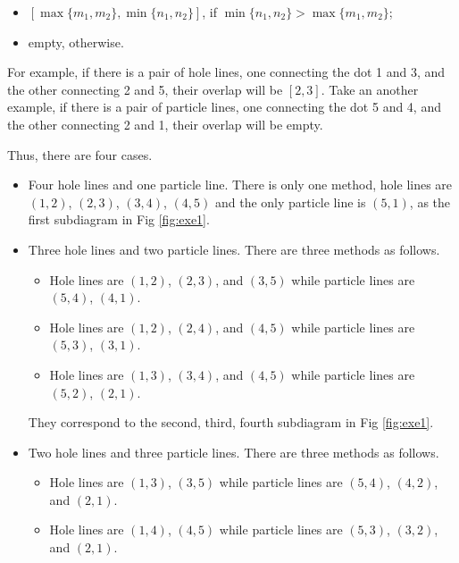 \documentclass[a4paper]{book}
\newcounter{solution}[chapter]
\newcommand\Figref[1]{Fig \ref{#1}}
\begin{document}
\begin{solution}
\begin{itemize}
	\item $[\max\{m_1, m_2\},\min\{n_1, n_2\}]$, if $\min\{n_1, n_2\} > \max\{m_1, m_2\}$;
	
	\item empty, otherwise. 
	
	\end{itemize}
	For example, if there is a pair of hole lines, one connecting the dot 1 and 3, and the other connecting 2 and 5, their overlap will be $[2, 3]$. Take an another example, if there is a pair of particle lines, one connecting the dot 5 and 4, and the other connecting 2 and 1, their overlap will be empty.
	
	Thus, there are four cases.
	\begin{itemize}
	
	\item Four hole lines and one particle line. There is only one method, hole lines are $(1,2)$, $(2,3)$, $(3,4)$, $(4,5)$ and the only particle line is $(5,1)$, as the first subdiagram in \Figref{fig:exe1}.
	
	\item Three hole lines and two particle lines. There are three methods as follows.
		\begin{itemize}
	
		\item Hole lines are $(1,2)$, $(2,3)$, and $(3,5)$ while particle lines are $(5,4)$, $(4,1)$.
		
		\item Hole lines are $(1,2)$, $(2,4)$, and $(4,5)$ while particle lines are $(5,3)$, $(3,1)$.
		
		\item Hole lines are $(1,3)$, $(3,4)$, and $(4,5)$ while particle lines are $(5,2)$, $(2,1)$.
	
		\end{itemize}
		They correspond to the second, third, fourth subdiagram in \Figref{fig:exe1}.
	
	\item Two hole lines and three particle lines. There are three methods as follows.
		\begin{itemize}
	
		\item Hole lines are $(1,3)$, $(3,5)$ while particle lines are $(5,4)$, $(4,2)$, and $(2,1)$.
		
		\item Hole lines are $(1,4)$, $(4,5)$ while particle lines are $(5,3)$, $(3,2)$, and $(2,1)$.
		

\end{itemize}
\end{itemize}
\end{solution}
\end{document}

